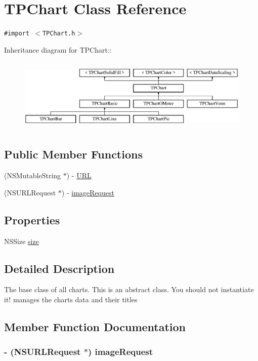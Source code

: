 \hypertarget{interface_t_p_chart}{
\section{TPChart Class Reference}
\label{interface_t_p_chart}
}
{\tt \#import $<$TPChart.h$>$}

Inheritance diagram for TPChart::\begin{figure}[H]
\begin{center}
\leavevmode
\includegraphics[height=3.5443cm]{interface_t_p_chart}
\end{center}
\end{figure}
\subsection*{Public Member Functions}
\begin{CompactItemize}
\item 
(NSMutableString $\ast$) - \hyperlink{interface_t_p_chart_0de05415b5d6de4d791a119a51468bf8}{URL}
\item 
(NSURLRequest $\ast$) - \hyperlink{interface_t_p_chart_34d673557c84b693e02cd5fe587b9c6f}{imageRequest}
\end{CompactItemize}
\subsection*{Properties}
\begin{CompactItemize}
\item 
NSSize \hyperlink{interface_t_p_chart_050f86ea651d6dee6d96cec69ff3a617}{size}
\end{CompactItemize}


\subsection{Detailed Description}
The base class of all charts. This is an abstract class. You should not instantiate it! manages the charts data and their titles 

\subsection{Member Function Documentation}
\hypertarget{interface_t_p_chart_34d673557c84b693e02cd5fe587b9c6f}{
\subsubsection[{imageRequest}]{\setlength{\rightskip}{0pt plus 5cm}- (NSURLRequest $\ast$) imageRequest }}
\label{interface_t_p_chart_34d673557c84b693e02cd5fe587b9c6f}


